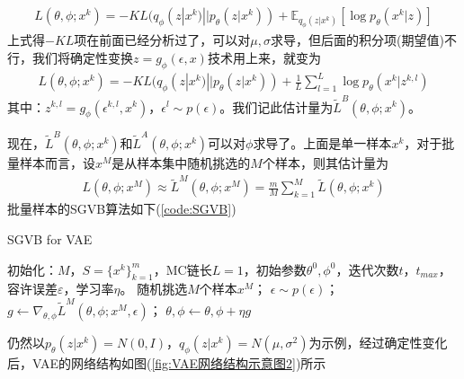             \begin{align*}
            L(\theta,\phi;x^k) = - KL(q_\phi(z|x^k)||p_\theta(z|x^k)) + \mathbb{E}_{q_\phi(z|x^k)} \left[ \log p_\theta(x^k|z) \right]
            \end{align*}
            上式得$-KL$项在前面已经分析过了，可以对$\mu,\sigma$求导，但后面的积分项(期望值)不行，我们将确定性变换$z = g_\phi(\epsilon,x)$技术用上来，就变为
            \begin{align*}
            L(\theta,\phi;x^k) = -KL(q_\phi(z|x^k) || p_\theta(z|x^k))+ \frac{1}{L}\sum_{l=1}^L \log p_\theta(x^k|z^{k,l})
            \end{align*}
            其中：$z^{k,l} = g_\phi(\epsilon^{k,l},x^k)$，$\epsilon^l\sim p(\epsilon)$。我们记此估计量为$\tilde{L}^B(\theta,\phi;x^k)$。
            \par
            现在，$\tilde{L}^B(\theta,\phi;x^k)$和$\tilde{L}^A(\theta,\phi;x^k)$可以对$\phi$求导了。上面是单一样本$x^k$，对于批量样本而言，设$x^M$是从样本集中随机挑选的$M$个样本，则其估计量为
            \begin{align*}
            L(\theta,\phi;x^M) \approx \tilde{L}^M(\theta,\phi;x^M) = \frac{m}{M} \sum_{k=1}^M \tilde{L}(\theta,\phi;x^k)
            \end{align*}
            批量样本的SGVB算法如下(\ref{code:SGVB})
            \begin{algorithm}[htbp]
                \caption{SGVB for VAE}\label{code:SGVB}
                \begin{algorithmic}[1]
                    \State 初始化：$M$，$S = \{x^k\}_{k=1}^m$，MC链长$L =1$，初始参数$\theta^0,\phi^0$，迭代次数$t$，$t_{max}$，容许误差$\varepsilon$，学习率$\eta $。
                        \State 随机挑选$M$个样本$x^M$；
                        \State $\epsilon \sim p(\epsilon)$；
                        \State $g \gets \nabla_{\theta,\phi}\tilde{L}^M(\theta,\phi;x^M,\epsilon)$；
                        \State $\theta,\phi \gets \theta,\phi + \eta g$
                    \EndWhile
                \end{algorithmic}
            \end{algorithm}
            \par
            仍然以$p_\theta(z|x^k) = N(0,I)$，$q_\phi(z|x^k)= N(\mu,\sigma^2)$为示例，经过确定性变化后，VAE的网络结构如图(\ref{fig:VAE网络结构示意图2})所示
